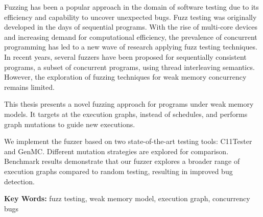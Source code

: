 
Fuzzing has been a popular approach in the domain of software testing due to its efficiency and capability to uncover  unexpected bugs. Fuzz testing was originally developed in the days of sequential programs. With the rise of multi-core devices and increasing demand for computational efficiency, the prevalence of concurrent programming has led to a new wave of research applying fuzz testing techniques. In recent years, several fuzzers have been proposed for sequentially consistent programs, a subset of concurrent programs, using thread interleaving semantics. However, the exploration of fuzzing techniques for weak memory concurrency remains limited.

This thesis presents a novel fuzzing approach for programs under weak memory models. It targets at the execution graphs, instead of schedules, and performs graph mutations to guide new executions.

We implement the fuzzer based on two state-of-the-art testing tools: C11Tester and GenMC. Different mutation strategies are explored for comparison. Benchmark results demonstrate that our fuzzer explores a broader range of execution graphs compared to random testing, resulting in improved bug detection.

\textbf{Key Words:} fuzz testing, weak memory model, execution graph, concurrency bugs

